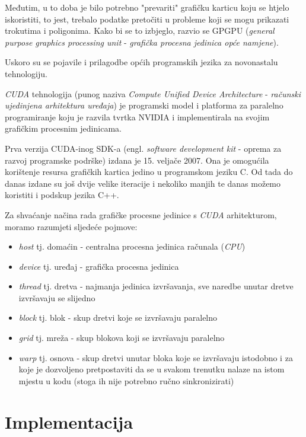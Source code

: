 \documentclass[times, utf8, zavrsni, numeric]{fer}
\begin{document}
Međutim, u to doba je bilo potrebno "prevariti" grafičku karticu koju se htjelo iskoristiti, to jest, trebalo podatke pretočiti u probleme koji se mogu prikazati trokutima i poligonima. Kako bi se to izbjeglo, razvio se GPGPU (\textit{general purpose graphics processing unit} - \textit{grafička procesna jedinica opće namjene}).

Uskoro su se pojavile i prilagodbe općih programskih jezika za novonastalu tehnologiju.

\textit{CUDA} tehnologija (punog naziva \textit{Compute Unified Device Architecture} - \textit{računski ujedinjena arhitektura uređaja}) je programski model i platforma za paralelno programiranje koju je razvila tvrtka NVIDIA i implementirala na svojim grafičkim procesnim jedinicama.\cite{cuda}

Prva verzija CUDA-inog SDK-a (engl. \textit{software development kit} - oprema za razvoj programske podrške) izdana je 15. veljače 2007. Ona je omogućila korištenje resursa grafičkih kartica jedino u programskom jeziku C. Od tada do danas izdane su još dvije velike iteracije i nekoliko manjih te danas možemo koristiti i podskup jezika C++.\cite{rahlezavrsni}

Za shvaćanje načina rada grafičke procesne jedinice s \emph{CUDA} arhitekturom, moramo razumjeti sljedeće pojmove\cite{rahlezavrsni}:
\begin{itemize}
\item \emph{host} tj. domaćin - centralna procesna jedinica računala (\emph{CPU})
\item \emph{device} tj. uređaj - grafička procesna jedinica
\item \emph{thread} tj. dretva - najmanja jedinica izvršavanja, sve naredbe unutar dretve izvršavaju se slijedno
\item \emph{block} tj. blok - skup dretvi koje se izvršavaju paralelno
\item \emph{grid} tj. mreža - skup blokova koji se izvršavaju paralelno
\item \emph{warp} tj. osnova - skup dretvi unutar bloka koje se izvršavaju istodobno i za koje je dozvoljeno pretpostaviti da se u svakom trenutku nalaze na istom mjestu u kodu (stoga ih nije potrebno ručno sinkronizirati)
\end{itemize}

\chapter{Implementacija}
\indent
\end{document}
